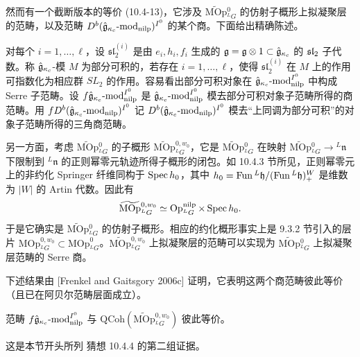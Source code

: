 然而有一个截断版本的等价 (10.4-13)，它涉及 $\widetilde{\mathrm{MOp}}{}^0_{{}^L G}$ 的仿射子概形上拟凝聚层的范畴，以及范畴 $D^b(\hat{\mathfrak{g}}_{\kappa_c}\text{-}\mathrm{mod}_{\mathrm{nilp}})^{I^0}$ 的某个商。下面给出精确陈述。

对每个 $i=1,\dots,\ell$，设 $\mathfrak{sl}_2^{(i)}$ 是由 $e_i,h_i,f_i$ 生成的 $\mathfrak{g}=\mathfrak{g}\otimes1\subset\hat{\mathfrak{g}}_{\kappa_c}$ 的 $\mathfrak{sl}_2$ 子代数。称 $\hat{\mathfrak{g}}_{\kappa_c}$-模 $M$ 为部分可积的，若存在 $i=1,\dots,\ell$，使得 $\mathfrak{sl}_2^{(i)}$ 在 $M$ 上的作用可指数化为相应群 $SL_2$ 的作用。容易看出部分可积对象在 $\hat{\mathfrak{g}}_{\kappa_c}\text{-}\mathrm{mod}_{\mathrm{nilp}}^{I^0}$ 中构成 Serre 子范畴。设 $f\hat{\mathfrak{g}}_{\kappa_c}\text{-}\mathrm{mod}_{\mathrm{nilp}}^{I^0}$ 是 $\hat{\mathfrak{g}}_{\kappa_c}\text{-}\mathrm{mod}_{\mathrm{nilp}}^{I^0}$ 模去部分可积对象子范畴所得的商范畴。用 $fD^b(\hat{\mathfrak{g}}_{\kappa_c}\text{-}\mathrm{mod}_{\mathrm{nilp}})^{I^0}$ 记 $D^b(\hat{\mathfrak{g}}_{\kappa_c}\text{-}\mathrm{mod}_{\mathrm{nilp}})^{I^0}$ 模去“上同调为部分可积”的对象子范畴所得的三角商范畴。

另一方面，考虑 $\widetilde{\mathrm{MOp}}{}^0_{{}^L G}$ 的子概形 $\widetilde{\mathrm{MOp}}{}^{0,w_0}_{{}^L G}$，它是 $\widetilde{\mathrm{MOp}}{}^0_{{}^L G}$ 在映射 $\widetilde{\mathrm{MOp}}{}^0_{{}^L G}\to{}^L\mathfrak{n}$ 下限制到 ${}^L\mathfrak{n}$ 的正则幂零元轨迹所得子概形的闭包。如 10.4.3 节所见，正则幂零元上的非约化 Springer 纤维同构于 $\operatorname{Spec} h_0$，其中 $h_0=\operatorname{Fun}{}^L\mathfrak{h}/(\operatorname{Fun}{}^L\mathfrak{h})^W_+$ 是维数为 $|W|$ 的 Artin 代数。因此有
\[
    \widetilde{\mathrm{MOp}}{}^{0,w_0}_{{}^L G}
    \simeq\operatorname{Op}^{\mathrm{nilp}}_{{}^L G}\times\operatorname{Spec} h_0.
\]
于是它确实是 $\widetilde{\mathrm{MOp}}{}^0_{{}^L G}$ 的仿射子概形。相应的约化概形事实上是 9.3.2 节引入的层片 $\mathrm{MOp}^{0,w_0}_{{}^L G}\subset\mathrm{MOp}^0_{{}^L G}$。$\widetilde{\mathrm{MOp}}{}^{0,w_0}_{{}^L G}$ 上拟凝聚层的范畴可以实现为 $\widetilde{\mathrm{MOp}}{}^0_{{}^L G}$ 上拟凝聚层范畴的 Serre 商。

下述结果由 [Frenkel and Gaitsgory 2006c] 证明，它表明这两个商范畴彼此等价（且已在阿贝尔范畴层面成立）。

\begin{theorem}\label{thm:u16-quot}
    范畴 $f\hat{\mathfrak{g}}_{\kappa_c}\text{-}\mathrm{mod}_{\mathrm{nilp}}^{I^0}$ 与 $\mathrm{QCoh}(\widetilde{\mathrm{MOp}}{}^{0,w_0}_{{}^L G})$ 彼此等价。
\end{theorem}

这是本节开头所列 猜想 10.4.4 的第二组证据。

